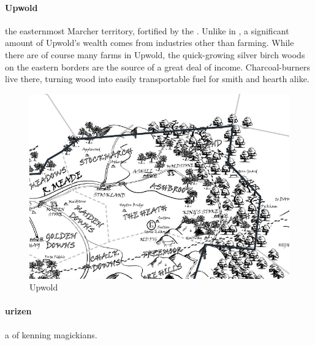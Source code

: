 \paragraph{Upwold} the easternmost Marcher territory, fortified by the . Unlike in , a significant amount of Upwold's wealth comes from industries other than farming. While there are of course many farms in Upwold, the quick-growing silver birch woods on the eastern borders are the source of a great deal of income. Charcoal-burners live there, turning wood into easily transportable fuel for smith and hearth alike. \begin{figure}\centering\includegraphics[width=19.5cm,angle=90]{atlasofthemarches/Upwold}\caption{Upwold}\end{figure}
\paragraph{urizen} a  of kenning magickians.
